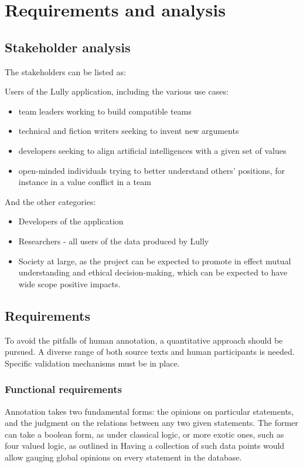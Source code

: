 \documentclass{report}
\begin{document}
\chapter{Requirements and analysis}

\section{Stakeholder analysis}
The stakeholders can be listed as:

Users of the Lully application, including the various use cases:
\begin{itemize}
  \item team leaders working to build compatible teams
  \item technical and fiction writers seeking to invent new arguments
  \item developers seeking to align artificial intelligences with a given set of values 
  \item open-minded individuals trying to better understand others' positions, for instance in a value conflict in a team
\end{itemize}

And the other categories:
\begin{itemize}
  \item Developers of the application 
  \item Researchers - all users of the data produced by Lully
  \item Society at large, as the project can be expected to promote in effect mutual understanding and ethical decision-making, which can be expected to have wide scope positive impacts.
\end{itemize}

\section{Requirements}
To avoid the pitfalls of human annotation, a quantitative approach should be pursued. A diverse range of both source texts and human participants is needed. Specific validation mechanisms must be in place.

\subsection{Functional requirements}

Annotation takes two fundamental forms: the opinions on particular statements, and the judgment on the relations between any two given statements.
The former can  take a boolean form, as under classical logic, or more exotic ones, such as four valued logic, as outlined in  \cite{priest_many-valued_2008}
Having a collection of such data points would allow gauging global opinions on every statement in the database.
\end{document}
